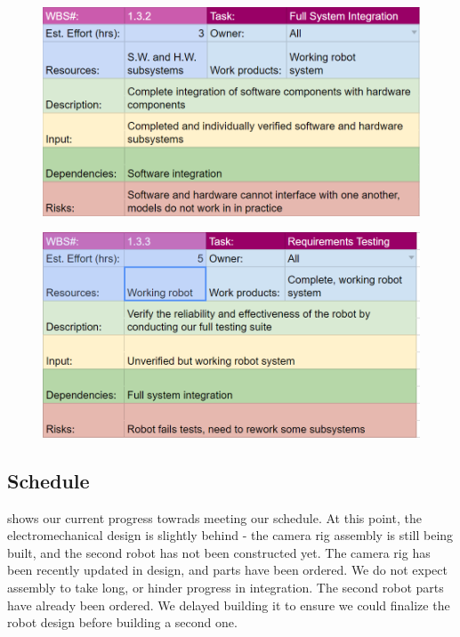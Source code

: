 \begin{figure}[h!]
\centering
\includegraphics[width=0.98\columnwidth]{wbs_schedule/wbs_dict_int2.PNG}
\label{fig:int1}
\end{figure}
\begin{figure}[h!]
\centering
\includegraphics[width=0.98\columnwidth]{wbs_schedule/wbs_dict_int3.PNG}
\label{fig:int1}
\end{figure}

\clearpage

\subsection{Schedule}
\label{sec:schedule}

 shows our current progress towrads meeting our schedule. At this point, the electromechanical design is slightly behind - the camera rig assembly is still being built, and the second robot has not been constructed yet. The camera rig has been recently updated in design, and parts have been ordered. We do not expect assembly to take long, or hinder progress in integration. The second robot parts have already been ordered. We delayed building it to ensure we could finalize the robot design before building a second one.

